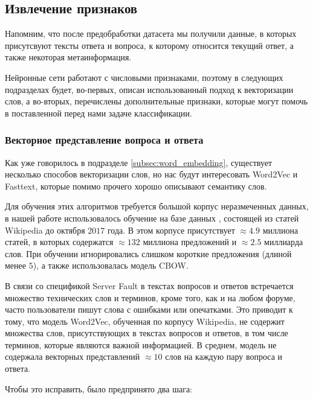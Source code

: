 \documentclass[../diploma.tex]{subfiles}
\begin{document}
	\label{sec:methods_and_implementation}

	\subsection{Извлечение признаков}

	Напомним, что после предобработки датасета мы получили данные, 
	в которых присутсвуют тексты ответа и вопроса, к которому относится текущий ответ, а также некоторая метаинформация.

	Нейронные сети работают с числовыми признаками, 
	поэтому в следующих подразделах будет, во-первых, описан использованный подход к векторизации слов, 
	а во-вторых, перечислены дополнительные признаки, которые могут помочь в поставленной перед нами задаче классификации.

	\subsubsection{Векторное представление вопроса и ответа}

   	Как уже говорилось в подразделе \ref{subsec:word_embedding}, существует несколько способов векторизации слов,
   	но нас будут интересовать Word2Vec и Fasttext, которые помимо прочего хорошо описывают семантику слов.

   	Для обучения этих алгоритмов требуется большой корпус неразмеченных данных, 
   	в нашей работе использовалось обучение на базе данных \cite{online:wiki_dump}, состоящей из статей Wikipedia до октября $2017$ года.
   	В этом корпусе присутствует $\approx 4.9$ миллиона статей, в которых содержатся $\approx 132$ миллиона предложений и $\approx 2.5$ миллиарда слов.
   	При обучении игнорировались слишком короткие предложения (длиной менее $5$), а также использовалась модель CBOW.

   	В связи со спецификой Server Fault в текстах вопросов и ответов встречается множество технических слов и терминов, 
   	кроме того, как и на любом форуме, часто пользователи пишут слова с ошибками или опечатками.
   	Это приводит к тому, что модель Word2Vec, обученная по корпусу Wikipedia, не содержит множества слов, присутствующих в текстах вопросов и ответов, 
   	в том числе терминов, которые являются важной информацией. В среднем, модель не содержала векторных представлений $\approx 10$ слов на каждую пару вопроса и ответа.

   	Чтобы это исправить, было предпринято два шага: 
   	
\end{document}
